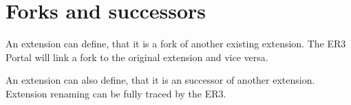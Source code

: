 \section[sec:forks]{Forks and successors}

An extension can define, that it is a fork of another existing extension.
The ER3 Portal will link a fork to the original extension and vice versa.

An extension can also define, that it is an successor of another extension.
Extension renaming can be fully traced by the ER3.
